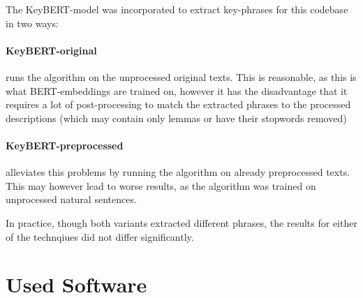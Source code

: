 The KeyBERT-model was incorporated to extract key-phrases for this codebase in two ways: 

\paragraph{KeyBERT-original} runs the algorithm on the unprocessed original texts. This is reasonable, as this is what BERT-embeddings are trained on, however it has the disadvantage that it requires a lot of post-processing to match the extracted phrases to the processed descriptions (which \eg may contain only lemmas or have their \glspl{stopword} removed)
\paragraph{KeyBERT-preprocessed} alleviates this problems by running the algorithm on already preprocessed texts. This may however lead to worse results, as the algorithm was trained on unprocessed natural sentences.

In practice, though both variants extracted different phrases, the results for either of the technqiues did not differ significantly.


\section{Used Software}




